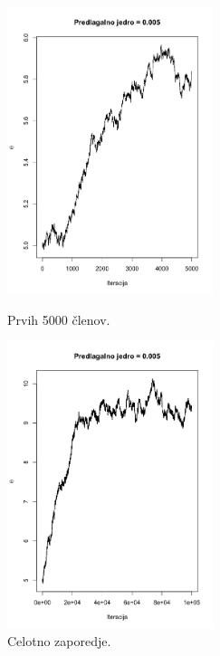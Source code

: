 \documentclass[a4paper,11pt]{article}
\begin{document}
    \begin{figure}[ht!]
        \begin{minipage}{0.5\textwidth}
            \centering
            \includegraphics[width = 60mm]{Slike/4_1c_S.png}
            \caption{Prvih 5000 členov.}
        \end{minipage}
        \begin{minipage}{0.5\textwidth}
            \centering
            \includegraphics[width = 60mm]{Slike/4_1c_celotno.png}
            \caption{Celotno zaporedje.}
        \end{minipage}
    \end{figure}
\end{document}
